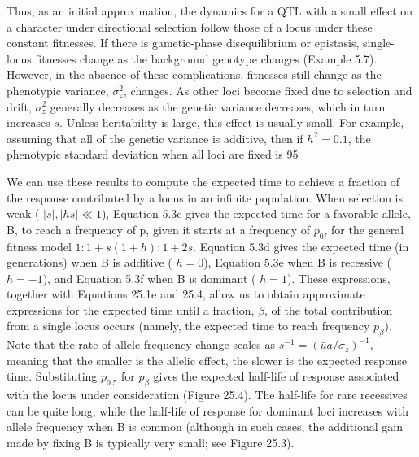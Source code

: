 \documentclass{article}
\begin{document}
Thus, as an initial approximation, the dynamics for a QTL with a small effect on a character under directional selection follow those of a locus under these constant fitnesses. If there is gametic-phase disequilibrium or epistasis, single-locus fitnesses change as the background genotype changes (Example 5.7). However, in the absence of these complications, fitnesses still change as the phenotypic variance,  $ \sigma_z^2 $, changes. As other loci become fixed due to selection and drift,  $ \sigma_z^2 $ generally decreases as the genetic variance decreases, which in turn increases  $ s $. Unless heritability is large, this effect is usually small. For example, assuming that all of the genetic variance is additive, then if  $ h^2 = 0.1 $, the phenotypic standard deviation when all loci are fixed is 95%

We can use these results to compute the expected time to achieve a fraction of the response contributed by a locus in an infinite population. When selection is weak ( $ |s|, |hs| \ll 1 $), Equation 5.3c gives the expected time for a favorable allele, B, to reach a frequency of p, given it starts at a frequency of  $ p_0 $, for the general fitness model  $ 1:1+s(1+h):1+2s $. Equation 5.3d gives the expected time (in generations) when B is additive ( $ h=0 $), Equation 5.3e when B is recessive ( $ h=-1 $), and Equation 5.3f when B is dominant ( $ h=1 $). These expressions, together with Equations 25.1e and 25.4, allow us to obtain approximate expressions for the expected time until a fraction,  $ \beta $, of the total contribution from a single locus occurs (namely, the expected time to reach frequency  $ p_\beta $). Note that the rate of allele-frequency change scales as  $ s^{-1} = (\bar{u}a/\sigma_z)^{-1} $, meaning that the smaller is the allelic effect, the slower is the expected response time. Substituting  $ p_{0.5} $ for  $ p_\beta $ gives the expected half-life of response associated with the locus under consideration (Figure 25.4). The half-life for rare recessives can be quite long, while the half-life of response for dominant loci increases with allele frequency when B is common (although in such cases, the additional gain made by fixing B is typically very small; see Figure 25.3).
\end{document}
